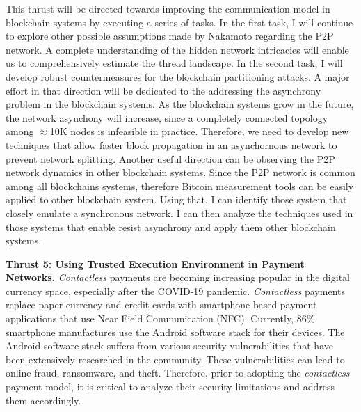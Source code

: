 \documentclass{NSF}
\newcommand{\BfPara}[1]{{\noindent\textbf{#1.}}\xspace}
\begin{document}
This thrust will be directed towards improving the communication model in blockchain systems by executing a series of tasks. In the first task, I will continue to explore other possible assumptions made by Nakamoto regarding the P2P network. A complete understanding of the hidden network intricacies will enable us to comprehensively estimate the thread landscape. In the second task, I will develop robust countermeasures for the blockchain partitioning attacks. A major effort in that direction will be dedicated to the addressing the asynchrony problem in the blockchain systems. As the blockchain systems grow in the future, the network asynchony will increase, since a completely connected topology among $\approx$10K nodes is infeasible in practice. Therefore, we need to develop new techniques that allow faster block propagation in an asynchornous network to prevent network splitting. Another useful direction can be observing the P2P network dynamics in other blockchain systems. Since the P2P network is common among all blockchains systems, therefore Bitcoin measurement tools can be easily applied to other blockchain system. Using that, I can identify those system that closely emulate a synchronous network. I can then analyze the techniques used in those systems that enable resist asynchrony and apply them other blockchain systems. 


\vspace{2mm}

\BfPara{Thrust 5: Using Trusted Execution Environment in Payment Networks} {\em Contactless} payments are becoming increasing popular in the digital currency space, especially after the COVID-19 pandemic. {\em Contactless} payments replace paper currency and credit cards with smartphone-based payment applications that use Near Field Communication (NFC). Currently, 86\% smartphone manufactures use the Android software stack for their devices. The Android software stack suffers from various security vulnerabilities that have been extensively researched in the community. These vulnerabilities can lead to online fraud, ransomware, and theft. Therefore, prior to adopting the {\em contactless} payment model, it is critical to analyze their security limitations and address them accordingly. 
\end{document}
